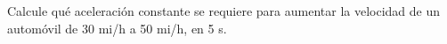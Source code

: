 \item Calcule qué aceleración constante se requiere para aumentar la velocidad de un automóvil de 30 mi/h a 50 mi/h, en 5 s.
